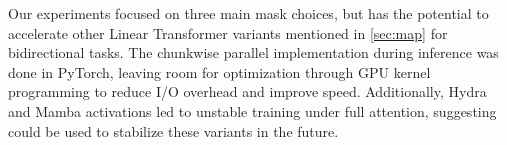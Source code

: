 Our experiments focused on three main mask choices, but \lion has the potential to accelerate other Linear Transformer variants mentioned in \cref{sec:map} for bidirectional tasks. The chunkwise parallel implementation during inference was done in PyTorch, leaving room for optimization through GPU kernel programming to reduce I/O overhead and improve speed. Additionally, Hydra and Mamba activations led to unstable training under full attention, suggesting \lion could be used to stabilize these variants in the future.
